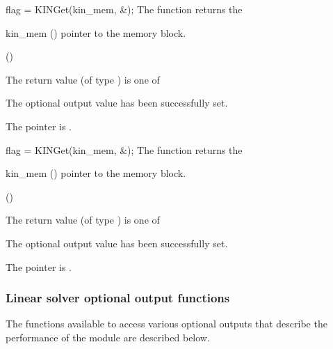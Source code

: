 {}
{
  flag = KINGet(kin\_mem, \&);
}
{
  The function  returns the
}
{
  \begin{args}
  \item[kin\_mem] ()
    pointer to the {\kinsol} memory block.
  \item[] (\id{})

  \end{args}
}
{
  The return value  (of type ) is one of
  \begin{args}
  \item[\Id{KIN\_SUCCESS}] 
    The optional output value has been successfully set.
  \item[\Id{KIN\_MEM\_NULL}]
    The  pointer is .
  \end{args}
}
{}
{
  flag = KINGet(kin\_mem, \&);
}
{
  The function  returns the
}
{
  \begin{args}
  \item[kin\_mem] ()
    pointer to the {\kinsol} memory block.
  \item[] (\id{})

  \end{args}
}
{
  The return value  (of type ) is one of
  \begin{args}
  \item[\Id{KIN\_SUCCESS}] 
    The optional output value has been successfully set.
  \item[\Id{KIN\_MEM\_NULL}]
    The  pointer is .
  \end{args}
}
{}
\subsubsection{Linear solver optional output functions}\label{sss:linsolv_io}
The functions available to access various optional outputs that describe the 
performance of the {\kinspgmr} module are described below.

